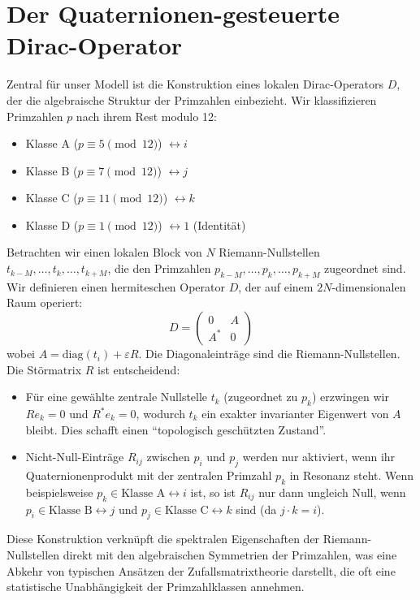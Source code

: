 \documentclass[11pt,a4paper]{article}
\newcommand{\eps}{\varepsilon}
\theoremstyle{definition}
\begin{document}
\section{Der Quaternionen-gesteuerte Dirac-Operator}
\label{sec:dirac_operator_de}
Zentral für unser Modell ist die Konstruktion eines lokalen Dirac-Operators $D$, der die algebraische Struktur der Primzahlen einbezieht. Wir klassifizieren Primzahlen $p$ nach ihrem Rest modulo 12:
\begin{itemize}
    \item Klasse A ($p \equiv 5 \pmod{12}$) $\leftrightarrow i$
    \item Klasse B ($p \equiv 7 \pmod{12}$) $\leftrightarrow j$
    \item Klasse C ($p \equiv 11 \pmod{12}$) $\leftrightarrow k$
    \item Klasse D ($p \equiv 1 \pmod{12}$) $\leftrightarrow 1$ (Identität)
\end{itemize}
Betrachten wir einen lokalen Block von $N$ Riemann-Nullstellen $t_{k-M}, \dots, t_k, \dots, t_{k+M}$, die den Primzahlen $p_{k-M}, \dots, p_k, \dots, p_{k+M}$ zugeordnet sind. Wir definieren einen hermiteschen Operator $D$, der auf einem $2N$-dimensionalen Raum operiert:
\begin{equation}
D = \begin{pmatrix} 0 & A \\ A^* & 0 \end{pmatrix}
\end{equation}
wobei $A = \text{diag}(t_i) + \eps R$. Die Diagonaleinträge sind die Riemann-Nullstellen. Die Störmatrix $R$ ist entscheidend:
\begin{itemize}
    \item Für eine gewählte zentrale Nullstelle $t_k$ (zugeordnet zu $p_k$) erzwingen wir $Re_k = 0$ und $R^*e_k = 0$, wodurch $t_k$ ein exakter invarianter Eigenwert von $A$ bleibt. Dies schafft einen ``topologisch geschützten Zustand''.
    \item Nicht-Null-Einträge $R_{ij}$ zwischen $p_i$ und $p_j$ werden nur aktiviert, wenn ihr Quaternionenprodukt mit der zentralen Primzahl $p_k$ in Resonanz steht. Wenn beispielsweise $p_k \in \text{Klasse A} \leftrightarrow i$ ist, so ist $R_{ij}$ nur dann ungleich Null, wenn $p_i \in \text{Klasse B} \leftrightarrow j$ und $p_j \in \text{Klasse C} \leftrightarrow k$ sind (da $j \cdot k = i$).
\end{itemize}
Diese Konstruktion verknüpft die spektralen Eigenschaften der Riemann-Nullstellen direkt mit den algebraischen Symmetrien der Primzahlen, was eine Abkehr von typischen Ansätzen der Zufallsmatrixtheorie darstellt, die oft eine statistische Unabhängigkeit der Primzahlklassen annehmen.
\end{document}
